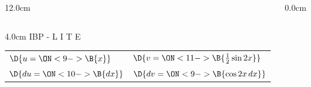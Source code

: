 \begin{frame}
\begin{columns}
\begin{column}{12.0cm}
\begin{columns}
\begin{column}{4.0cm}
IBP \quad - \quad L \quad I \quad {} \quad T \quad E
\setlength{\extrarowheight}{0.2cm}
\begin{tabular}{ p{1.1cm} p{1.6cm} }
	\hline
	$\D{u = \ON<9->{\B{x}}}$ & 
	$\D{v = \ON<11->{\B{\frac{1}{2}\sin2x}}}$ \\
	$\D{du = \ON<10->{\B{ dx}}}$ & 
	$\D{dv = \ON<9->{\B{ \cos 2x\, dx}}}$ \\
\end{tabular}

\end{column}
\end{columns}
	
\end{column}
\begin{column}{0.0cm}\end{column}
\end{columns}
\end{frame}

